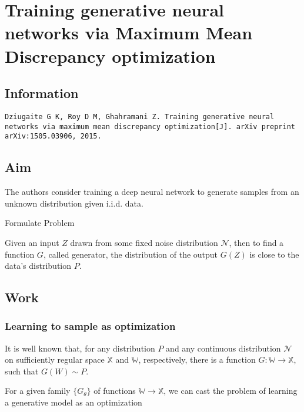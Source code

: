 \documentclass[]{article}
\date{}
\begin{document}
\section{Training generative neural networks via Maximum Mean
Discrepancy
optimization}\label{training-generative-neural-networks-via-maximum-mean-discrepancy-optimization}

\subsection{Information}\label{information}

\begin{verbatim}
Dziugaite G K, Roy D M, Ghahramani Z. Training generative neural networks via maximum mean discrepancy optimization[J]. arXiv preprint arXiv:1505.03906, 2015.
\end{verbatim}

\subsection{Aim}\label{aim}

The authors consider training a deep neural network to generate samples
from an unknown distribution given i.i.d. data.


Formulate Problem

Given an input \(Z\) drawn from some fixed noise distribution
\(\mathcal{N}\), then to find a function \(G\), called generator, the
distribution of the output \(G(Z)\) is close to the data's distribution
\(P\).

\subsection{Work}\label{work}

\subsubsection{Learning to sample as
optimization}\label{learning-to-sample-as-optimization}

It is well known that, for any distribution \(P\) and any continuous
distribution \(\mathcal N\) on sufficiently regular space \(\mathbb X\)
and \(\mathbb W\), respectively, there is a function
\(G: \mathbb W \rightarrow \mathbb X\), such that \(G(W) \sim P\).

For a given family \(\{G_{\theta} \}\) of functions
\(\mathbb W \rightarrow \mathbb X\), we can cast the problem of learning
a generative model as an optimization
\end{document}
